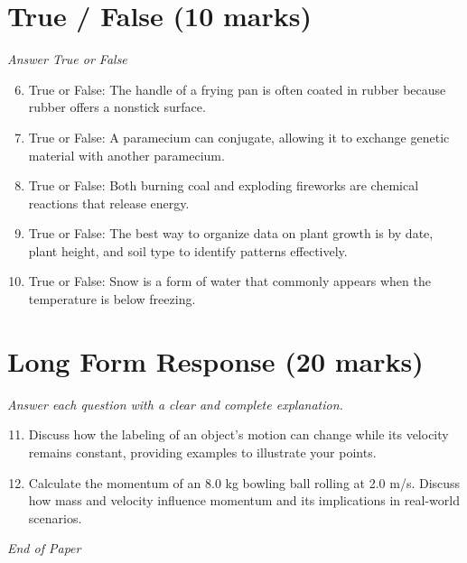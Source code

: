 \documentclass[12pt]{article}
\begin{document}
\section*{True / False (10 marks)}
\textit{Answer True or False}
\begin{enumerate}[label=\arabic*.]
\setcounter{enumi}{5}
\item True or False: The handle of a frying pan is often coated in rubber because rubber offers a nonstick surface.
\item True or False: A paramecium can conjugate, allowing it to exchange genetic material with another paramecium.
\item True or False: Both burning coal and exploding fireworks are chemical reactions that release energy.
\item True or False: The best way to organize data on plant growth is by date, plant height, and soil type to identify patterns effectively.
\item True or False: Snow is a form of water that commonly appears when the temperature is below freezing.
\end{enumerate}

\section*{Long Form Response (20 marks)}
\textit{Answer each question with a clear and complete explanation.}
\begin{enumerate}[label=\arabic*.]
\setcounter{enumi}{10}
\item Discuss how the labeling of an object's motion can change while its velocity remains constant, providing examples to illustrate your points.
\item Calculate the momentum of an 8.0 kg bowling ball rolling at 2.0 m/s. Discuss how mass and velocity influence momentum and its implications in real-world scenarios.
\end{enumerate}

\vfill
\noindent\textit{End of Paper}
\end{document}

